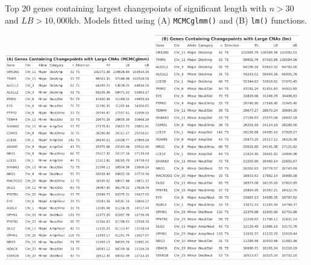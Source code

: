 \vfill
\begin{table}[!h]
\vspace{6cm}
\caption[Top 20 genes containing largest changepoints of significant length with $n > 30$ and $LB > 10,000$kb.]{Top 20 genes containing largest changepoints of significant length with $n > 30$ and $LB > 10,000$kb. Models fitted using (A) \texttt{MCMCglmm()} and (B) \texttt{lm()} functions.}
\centering
\includegraphics[width = 0.48\textwidth]{../tables/Chapter_6/Gene_MCMC_1_Thesis.png}
\includegraphics[width = 0.48\textwidth]{../tables/Chapter_6/Gene_LM_1_Thesis.png}
\label{tab:TopLength_Genes_1}
\end{table}
\vfill

